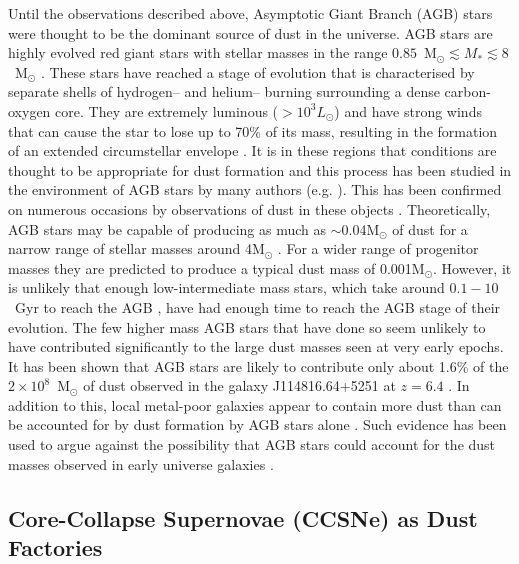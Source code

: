 Until the observations described above, Asymptotic Giant Branch (AGB) stars were thought to be the dominant source of dust in the universe.  AGB stars are highly evolved red giant stars with stellar masses in the range $0.85$~M$_{\odot} \lesssim M_{*} \lesssim 8$~M$_{\odot}$ \citep{Iben1983}.  These stars have reached a stage of evolution that is characterised by separate shells of hydrogen-- and helium-- burning surrounding a dense carbon-oxygen core. They are extremely luminous ($>10^3L_{\odot}$) and have strong winds that can cause the star to lose up to 70\% of its mass, resulting in the formation of an extended circumstellar envelope \citep{Wood2004a}.  It is in these regions that conditions are thought to be appropriate for dust formation and this process has been studied in the environment of AGB stars by many authors (e.g. \citet{Gail1999,Cherchneff2000,Ferrarotti2005}).  This has been confirmed on numerous occasions by observations of dust  in these objects \citep{Meixner2006,Matsuura2009,Sloan2009,Boyer2011,Boyer2012,Riebel2012,Matsuura2013}. Theoretically, AGB stars may be capable of producing as much as $\sim$0.04M$_{\odot}$ of dust for a narrow range of stellar masses around 4M$_{\odot}$ \citep{Ferrarotti2006}.  For a wider range of progenitor masses they are predicted to produce a typical dust mass of 0.001M$_{\odot}$. However, it is unlikely that enough low-intermediate mass stars, which take around $0.1-10$~Gyr to reach the AGB \citep{Salaris2014}, 
have had enough time to reach the AGB stage of their evolution.  The few higher mass AGB stars that have done so seem unlikely to have contributed significantly to the large dust masses seen at very early epochs.  It has been shown that AGB stars are likely to contribute only about 1.6\% of the $2\times 10^8$~M$_{\odot}$ of dust observed in the galaxy J114816.64+5251 at $z=6.4$ \citep{Dwek2007}.  In addition to this, local metal-poor galaxies appear to contain more dust than can be accounted for by dust formation by AGB stars alone \citep{Matsuura2009,Boyer2011,Boyer2012,Matsuura2013}.  Such evidence has been used to argue against the possibility that AGB stars could account for the dust masses observed in early universe galaxies \citep{Michalowski2015}.

\subsection[Core-Collapse Supernovae as Dust Factories]{Core-Collapse Supernovae (CCSNe) as Dust Factories}

